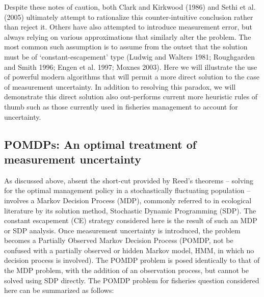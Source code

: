 \documentclass[3p]{elsarticle} %
\begin{document}
Despite these notes of caution, both Clark and Kirkwood (1986) and Sethi
et al. (2005) ultimately attempt to rationalize this counter-intuitive
conclusion rather than reject it. Others have also attempted to
introduce measurement error, but always relying on various
approximations that similarly alter the problem. The most common such
assumption is to assume from the outset that the solution must be of
`constant-escapement' type (Ludwig and Walters 1981; Roughgarden and
Smith 1996; Engen et al. 1997; Moxnes 2003). Here we will illustrate the
use of powerful modern algorithms that will permit a more direct
solution to the case of measurement uncertainty. In addition to
resolving this paradox, we will demonstrate this direct solution also
out-performs current more heuristic rules of thumb such as those
currently used in fisheries management to account for uncertainty.

\subsection{POMDPs: An optimal treatment of measurement
uncertainty}\label{pomdps-an-optimal-treatment-of-measurement-uncertainty}

As discussed above, absent the short-cut provided by Reed's theorems --
solving for the optimal management policy in a stochastically
fluctuating population -- involves a Markov Decision Process (MDP),
commonly referred to in ecological literature by its solution method,
Stochastic Dynamic Programming (SDP). The constant escapement (CE)
strategy considered here is the result of such an MDP or SDP analysis.
Once measurement uncertainty is introduced, the problem becomes a
Partially Observed Markov Decision Process (POMDP, not be confused with
a partially observed or hidden Markov model, HMM, in which no decision
process is involved). The POMDP problem is posed identically to that of
the MDP problem, with the addition of an observation process, but cannot
be solved using SDP directly. The POMDP problem for fisheries question
considered here can be summarized as follows:
\end{document}
